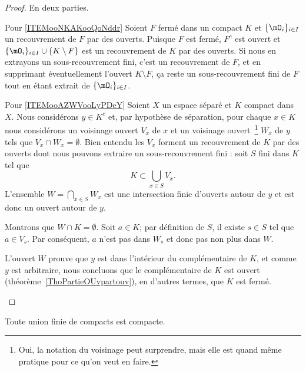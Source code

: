 \begin{proof}
	En deux parties.
	\begin{subproof}
		\item[Pour \ref{ITEMooNKAKooQoNddr}]
		Soient \( F\) fermé dans un compact \( K\) et \( \{ \mO_i \}_{i\in I}\) un recouvrement de \( F\) par des ouverts. Puisque \( F\) est fermé, \( F^c\) est ouvert et \( \{ \mO_i \}_{i\in I}\cup\{ K\setminus F \}\) est un recouvrement de \( K\) par des ouverts. Si nous en extrayons un sous-recouvrement fini, c'est un recouvrement de \( F\), et en supprimant éventuellement l'ouvert \( K\setminus F\), ça reste un sous-recouvrement fini de \( F\) tout en étant extrait de \( \{ \mO_i \}_{i\in I}\).

		\item[Pour \ref{ITEMooAZWVooLyPDeY}]
		Soient \( X\) un espace séparé et \( K\) compact dans \( X\). Nous considérons \( y \in K^c\) et, par hypothèse de séparation, pour chaque \( x\in K\) nous considérons un voisinage ouvert \( V_x\) de \( x\) et un voisinage ouvert~\footnote{Oui, la notation du voisinage peut surprendre, mais elle est quand même pratique pour ce qu'on veut en faire.} \( W_x\) de \( y\) tels que \( V_x\cap W_x=\emptyset\). Bien entendu les \( V_x\) forment un recouvrement de \( K\) par des ouverts dont nous pouvons extraire un sous-recouvrement fini : soit \( S\) fini dans \( K\) tel que
		\begin{equation}
			K\subset\bigcup_{x\in S}V_x.
		\end{equation}
		L'ensemble \( W=\bigcap_{x\in S}W_x\) est une intersection finie d'ouverts autour de \( y\) et est donc un ouvert autour de \( y\).

		Montrons que \( W\cap K=\emptyset\). Soit \( a\in K\); par définition de \( S\), il existe \( s\in S\) tel que \( a\in V_s\). Par conséquent, \( a\) n'est pas dans \( W_s\) et donc pas non plus dans \( W\).

		L'ouvert \( W\) prouve que \( y\) est dans l'intérieur du complémentaire de \( K\), et comme \( y \) est arbitraire, nous concluons que le complémentaire de \( K\) est ouvert (théorème~\ref{ThoPartieOUvpartouv}), en d'autres termes, que \( K\) est fermé.
	\end{subproof}
\end{proof}


\begin{lemma}        \label{LEMooFJZDooSxYWVW}
	Toute union finie de compacts est compacte.
\end{lemma}

